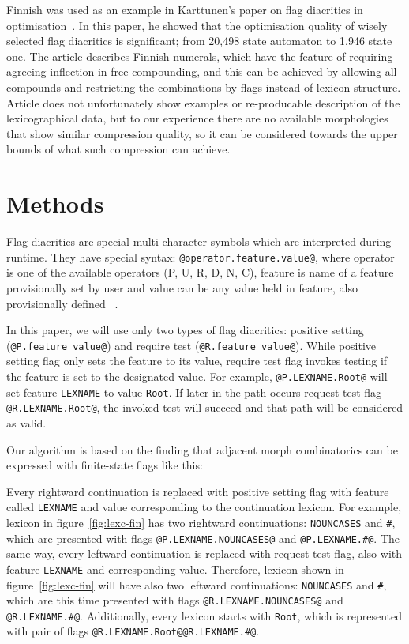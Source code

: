 \documentclass[11pt]{article}
\begin{document}
Finnish was used as an example in Karttunen's paper on flag diacritics in
optimisation~. In this paper, he showed that
the optimisation quality of wisely selected flag diacritics is significant;
from 20,498 state automaton to 1,946 state one. The article describes Finnish
numerals, which have the feature of requiring agreeing inflection in free
compounding, and this can be achieved by allowing all compounds and restricting
the combinations by flags instead of lexicon structure. Article does not
unfortunately show examples or re-producable description of the lexicographical
data, but to our experience there are no available morphologies that show
similar compression quality, so it can be considered towards the upper bounds
of what such compression can achieve.
 

\section{Methods}
\label{sec:methods}

Flag diacritics are special multi-character symbols which are interpreted during runtime. They have special syntax: \verb+@operator.feature.value@+, where operator is one of the available operators (P, U, R, D, N, C), feature is name of a feature provisionally set by user and value can be any value held in feature, also provisionally defined ~\cite{beesley2003finite}.

In this paper, we will use only two types of flag diacritics: positive setting (\verb+@P.feature value@+) and require test (\verb+@R.feature value@+). While positive setting flag only sets the feature to its value, require test flag invokes testing if the feature is set to the designated value.
For example, \verb+@P.LEXNAME.Root@+ will set feature \texttt{LEXNAME} to value \texttt{Root}. If later in the path occurs request test flag \verb+@R.LEXNAME.Root@+, the invoked test will succeed and that path will be considered as valid. 

Our algorithm is based on the finding that adjacent morph combinatorics can be expressed with finite-state flags like this:

Every rightward continuation is replaced with positive setting flag with feature called \texttt{LEXNAME} and value corresponding to the continuation lexicon. For example, lexicon in figure~\ref{fig:lexc-fin} has two rightward continuations: \texttt{NOUNCASES} and \texttt{\#}, which are presented with flags \verb+@P.LEXNAME.NOUNCASES@+ and \verb+@P.LEXNAME.#@+. 
The same way, every leftward continuation is replaced with request test flag, also with feature \texttt{LEXNAME} and corresponding value. Therefore, lexicon shown in figure~\ref{fig:lexc-fin} will have also two leftward continuations: \texttt{NOUNCASES} and \texttt{\#}, which are this time presented with flags \verb+@R.LEXNAME.NOUNCASES@+ and \verb+@R.LEXNAME.#@+. Additionally, every lexicon starts with \texttt{Root}, which is represented with pair of flags \verb+@R.LEXNAME.Root@@R.LEXNAME.#@+.
\end{document}
